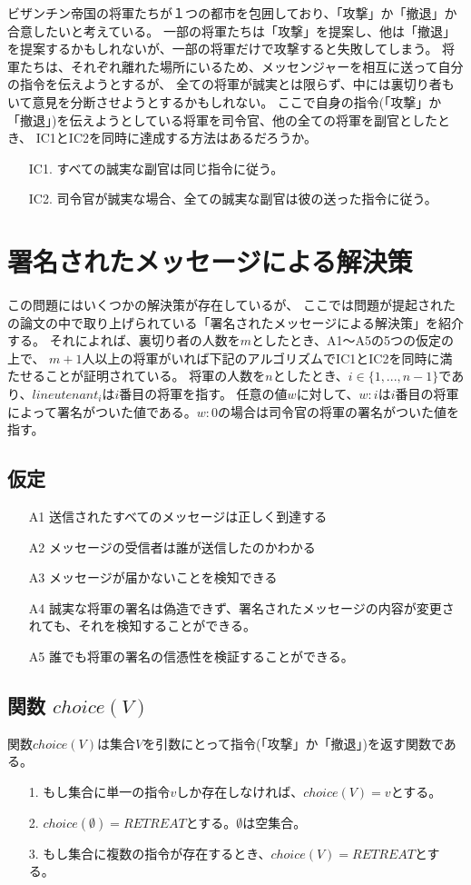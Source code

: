 ビザンチン帝国の将軍たちが１つの都市を包囲しており、「攻撃」か「撤退」か合意したいと考えている。
一部の将軍たちは「攻撃」を提案し、他は「撤退」を提案するかもしれないが、一部の将軍だけで攻撃すると失敗してしまう。
将軍たちは、それぞれ離れた場所にいるため、メッセンジャーを相互に送って自分の指令を伝えようとするが、
全ての将軍が誠実とは限らず、中には裏切り者もいて意見を分断させようとするかもしれない。
ここで自身の指令(「攻撃」か「撤退」)を伝えようとしている将軍を司令官、他の全ての将軍を副官としたとき、
IC1とIC2を同時に達成する方法はあるだろうか。

\begin{itemize}
  \item[IC1.] すべての誠実な副官は同じ指令に従う。
  \item[IC2.] 司令官が誠実な場合、全ての誠実な副官は彼の送った指令に従う。
\end{itemize}

\section{署名されたメッセージによる解決策}
この問題にはいくつかの解決策が存在しているが、
ここでは問題が提起されたの論文の中で取り上げられている「署名されたメッセージによる解決策」を紹介する。
それによれば、裏切り者の人数を$m$としたとき、A1〜A5の5つの仮定の上で、
$m+1$人以上の将軍がいれば下記のアルゴリズムでIC1とIC2を同時に満たせることが証明されている。
将軍の人数を$n$としたとき、$i \in \{1,...,n-1\}$であり、$lineutenant_i$は$i$番目の将軍を指す。
任意の値$w$に対して、$w:i$は$i$番目の将軍によって署名がついた値である。$w:0$の場合は司令官の将軍の署名がついた値を指す。

\subsection{仮定}
\begin{itemize}
  \item[A1] 送信されたすべてのメッセージは正しく到達する
  \item[A2] メッセージの受信者は誰が送信したのかわかる
  \item[A3] メッセージが届かないことを検知できる
  \item[A4] 誠実な将軍の署名は偽造できず、署名されたメッセージの内容が変更されても、それを検知することができる。
  \item[A5] 誰でも将軍の署名の信憑性を検証することができる。
\end{itemize}

\subsection{関数 $choice(V)$}
関数$choice(V)$は集合$V$を引数にとって指令(「攻撃」か「撤退」)を返す関数である。
\begin{enumerate}
  \item[1.] もし集合に単一の指令$v$しか存在しなければ、$choice(V) = v$とする。
  \item[2.] $choice(\emptyset) = RETREAT$とする。$\emptyset$は空集合。
  \item[3.] もし集合に複数の指令が存在するとき、$choice(V) = RETREAT$とする。
\end{enumerate}

